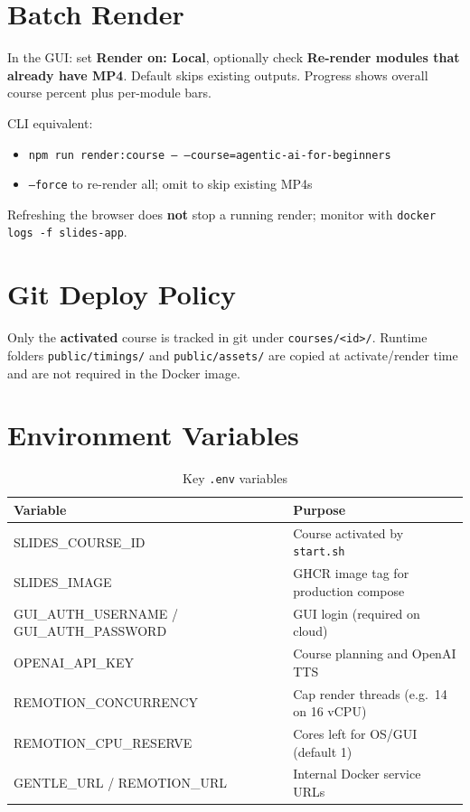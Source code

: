 \documentclass{scinexus}
\newcommand{\tableheadrow}[1]{\sffamily\bfseries\color{rbnavy} #1}
\begin{document}
\section{Batch Render}

\diagramBatchRender

In the GUI: set \textbf{Render on: Local}, optionally check \textbf{Re-render modules that already have MP4}. Default skips existing outputs. Progress shows overall course percent plus per-module bars.

CLI equivalent:

\begin{itemize}
	\item \texttt{npm run render:course -- --course=agentic-ai-for-beginners}
	\item \texttt{--force} to re-render all; omit to skip existing MP4s
\end{itemize}

Refreshing the browser does \textbf{not} stop a running render; monitor with \texttt{docker logs -f slides-app}.

\section{Git Deploy Policy}

\diagramGitPolicy

Only the \textbf{activated} course is tracked in git under \texttt{courses/<id>/}. Runtime folders \texttt{public/timings/} and \texttt{public/assets/} are copied at activate/render time and are not required in the Docker image.

\section{Environment Variables}

\begin{table}[htbp]
	\centering
	\footnotesize
	\caption{Key \texttt{.env} variables}
	\begin{tabularx}{\textwidth}{@{}l L@{}}
		\toprule
		\tableheadrow{Variable} & \tableheadrow{Purpose} \\
		\midrule
		SLIDES\_COURSE\_ID & Course activated by \texttt{start.sh} \\
		SLIDES\_IMAGE & GHCR image tag for production compose \\
		GUI\_AUTH\_USERNAME / GUI\_AUTH\_PASSWORD & GUI login (required on cloud) \\
		OPENAI\_API\_KEY & Course planning and OpenAI TTS \\
		REMOTION\_CONCURRENCY & Cap render threads (e.g.\ 14 on 16 vCPU) \\
		REMOTION\_CPU\_RESERVE & Cores left for OS/GUI (default 1) \\
		GENTLE\_URL / REMOTION\_URL & Internal Docker service URLs \\
		\bottomrule
	\end{tabularx}
\end{table}
\end{document}
